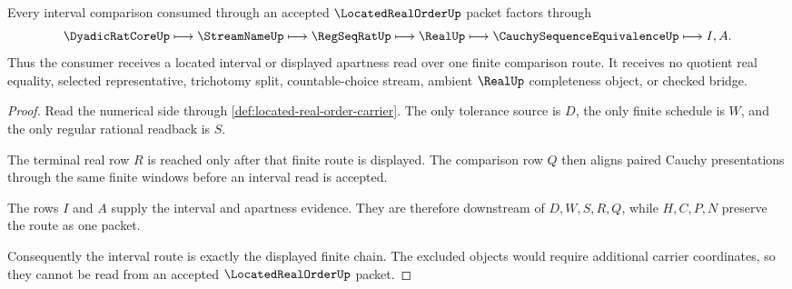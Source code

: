 \begin{theorem}
\label{thm:located-real-order-interval-route}
Every interval comparison consumed through an accepted $\LocatedRealOrderUp$ packet factors through
$$
\DyadicRatCoreUp \longmapsto \StreamNameUp \longmapsto \RegSeqRatUp \longmapsto
\RealUp \longmapsto \CauchySequenceEquivalenceUp \longmapsto I,A .
$$
Thus the consumer receives a located interval or displayed apartness read over one finite comparison route. It receives no quotient real equality, selected representative, trichotomy split, countable-choice stream, ambient $\RealUp$ completeness object, or checked bridge.
\end{theorem}
\begin{proof}
Read the numerical side through \autoref{def:located-real-order-carrier}. The only tolerance source is $D$, the only finite schedule is $W$, and the only regular rational readback is $S$.

The terminal real row $R$ is reached only after that finite route is displayed. The comparison row $Q$ then aligns paired Cauchy presentations through the same finite windows before an interval read is accepted.

The rows $I$ and $A$ supply the interval and apartness evidence. They are therefore downstream of $D,W,S,R,Q$, while $H,C,P,N$ preserve the route as one packet.

Consequently the interval route is exactly the displayed finite chain. The excluded objects would require additional carrier coordinates, so they cannot be read from an accepted $\LocatedRealOrderUp$ packet.
\end{proof}



